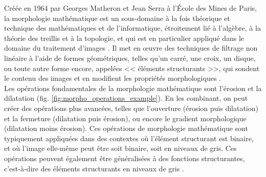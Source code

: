 Créée en 1964 par Georges Matheron et Jean Serra à l'École des Mines de Paris, la morphologie mathématique est un sous-domaine à la fois théorique et technique des mathématiques et de l'informatique, étroitement lié à l'algèbre, à la théorie des treillis et à la topologie, et qui est en particulier appliqué dans le domaine du traitement d'images \cite{Serra_1983}. Il met en œuvre des techniques de filtrage non linéaire à l'aide de formes géométriques, telles qu'un carré, une croix, un disque, ou toute autre forme encore, appelées << éléments structurants >>, qui sondent le contenu des images et en modifient les propriétés morphologiques \cite{Serra_1986}. \\

\vspace{-2mm}
Les opérations fondamentales de la morphologie mathématique sont l'érosion et la dilatation (fig. \ref{fig:morpho_operations_example}). En les combinant, on peut créer des opérations plus avancées, telles que l'ouverture (érosion puis dilatation) et la fermeture (dilatation puis érosion), ou encore le gradient morphologique (dilatation moins érosion). Ces opérations de morphologie mathématique sont typiquement appliquées dans des contextes où l'élément structurant est binaire, et où l'image elle-même peut être soit binaire, soit en niveaux de gris. Ces opérations peuvent également être généralisées à des fonctions structurantes, c'est-à-dire des éléments structurants en niveaux de gris \cite{Haralick_1987, Serra_1992}. \\

